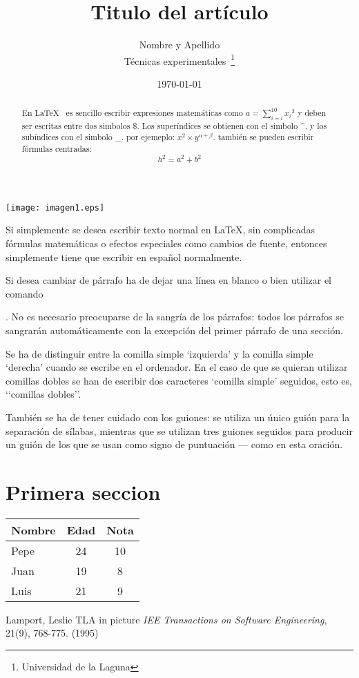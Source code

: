 \documentclass[a4paper,12pt]{article}
\begin{document}
  \texttt{[image: imagen1.eps]}

  Si simplemente se desea escribir texto normal en LaTeX,
  sin complicadas f\'ormulas matem\'aticas o efectos especiales
  como cambios de fuente, entonces simplemente tiene que escribir
  en espa\~nol normalmente.
  
  Si desea cambiar de p\'arrafo ha de dejar una l\'inea en blanco o bien
  utilizar el comando \par.
  No es necesario preocuparse de la sangr\'ia de los p\'arrafos:
  todos los p\'arrafos se sangrar\'an autom\'aticamente con la excepci\'on
  del primer p\'arrafo de una secci\'on.
  
  Se ha de distinguir entre la comilla simple ‘izquierda’
  y la comilla simple ‘derecha’ cuando se escribe en el ordenador.
  En el caso de que se quieran utilizar comillas dobles se han de
  escribir dos caracteres ‘comilla simple’ seguidos, esto es,
  ‘‘comillas dobles’’.
  
  Tambi\'en se ha de tener cuidado con los guiones: se utiliza un \'unico
  gui\'on para la separaci\'on de s\'ilabas, mientras que se utilizan
  tres guiones seguidos para producir un gui\'on de los que se usan
  como signo de puntuaci\'on --- como en esta oraci\'on.
  

  
  \title{Titulo del art\'iculo}
  \author{Nombre y Apellido \\ 
	  T\'ecnicas experimentales~\footnote{Universidad de la Laguna}
	  }
  \date{\today}
  \maketitle
  
  \begin{abstract}
   En \LaTeX{}~\cite{Lam:86} es sencillo escribir expresiones
   matem\'aticas como $a=\sum_{i=i}^{10} {x_i}^{3}$
   y deben ser escritas entre dos simbolos \$.
   Los super\'indices se obtienen con el simbolo \^{}, y
   los sub\'indices con el simbolo \_. 
   por ejemeplo: $x^2 \times y^{\alpha + \beta}$.
   tambi\'en se pueden escribir f\'ormulas centradas:
   \[h^2=a^2 + b^2\] 
  \end{abstract}
  
  \section{Primera seccion}
  
  \bigskip
  \begin{tabular}{|l|c|c|}
    \hline
      Nombre & Edad & Nota \\ \hline
      Pepe   & 24   & 10 \\ \hline
      Juan   & 19   & 8 \\ \hline
      Luis   & 21   & 9 \\ \hline      
      
  \end{tabular}

  
  
  \begin{thebibliography}{00}
    Lamport, Leslie
    TLA in picture
    \emph{IEE Transactions on Software Engineering},
    21(9), 768-775.
    (1995)
  \end{thebibliography}
\end{document}
